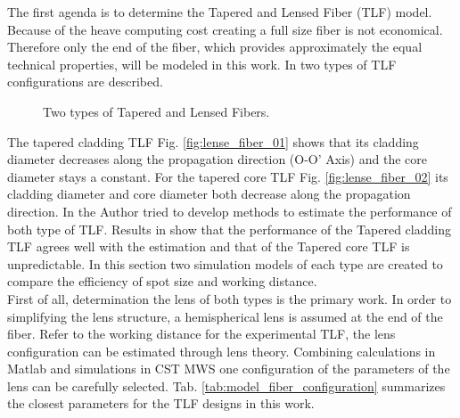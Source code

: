 The first agenda is to determine the Tapered and Lensed Fiber (TLF) model. Because of the heave computing cost creating a full size fiber is not economical. Therefore only the end of the fiber, which provides approximately the equal technical properties, will be modeled in this work. In \cite{TLF_analysis,TLF_mode_transforming} two types of TLF configurations are described.\\ 

\begin{figure}[!ht]
\centering
{}
\hfill
{}
\label{fig:two_TLF}
\caption{Two types of Tapered and Lensed Fibers.}
\end{figure}
The tapered cladding TLF Fig. \ref{fig:lense_fiber_01} shows that its cladding diameter decreases along the propagation direction (O-O' Axis) and the core diameter stays a constant. For the tapered core TLF Fig. \ref{fig:lense_fiber_02} its cladding diameter and core diameter both decrease along the propagation direction. In \cite{TLF_mode_transforming} the Author tried to develop methods to estimate the performance of both type of TLF. Results in \cite{TLF_mode_transforming} show that the performance of the Tapered cladding TLF agrees well with the estimation and that of the Tapered core TLF is unpredictable. In this section two simulation models of each type are created to compare the efficiency of spot size and working distance.\\  

First of all, determination the lens of both types is the primary work. In order to simplifying the lens structure, a hemispherical lens is assumed at the end of the fiber. Refer to the working distance for the experimental TLF, the lens configuration can be estimated through lens theory. Combining calculations in Matlab and simulations in CST MWS one configuration of the parameters of the lens can be carefully selected. Tab. \ref{tab:model_fiber_configuration} summarizes the closest parameters for the TLF designs in this work.\\   

